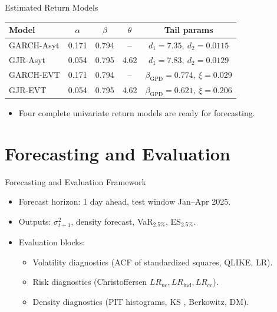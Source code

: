 \documentclass[aspectratio=169,11pt]{beamer}
\begin{document}
\begin{frame}{Estimated Return Models}
\small
\begin{table}
\centering
\begin{tabular}{lcccc}
\toprule
Model & \(\alpha\) & \(\beta\) & \(\theta\) & Tail params \\
\midrule
GARCH-Asyt & 0.171 & 0.794 & -- & \(d_1=7.35,\ d_2=0.0115\) \\
GJR-Asyt & 0.054 & 0.795 & 4.62 & \(d_1=7.83,\ d_2=0.0129\) \\
GARCH-EVT & 0.171 & 0.794 & -- & \(\beta_{\text{GPD}}=0.774,\ \xi=0.029\) \\
GJR-EVT & 0.054 & 0.795 & 4.62 & \(\beta_{\text{GPD}}=0.621,\ \xi=0.206\) \\
\bottomrule
\end{tabular}
\end{table}
\begin{itemize}
\item Four complete univariate return models are ready for forecasting.
\end{itemize}
\end{frame}

\section{Forecasting and Evaluation}
\begin{frame}{Forecasting and Evaluation Framework}
\begin{itemize} \setlength{\itemsep}{1em}
\item Forecast horizon: 1 day ahead, test window Jan--Apr 2025.
\item Outputs: \(\sigma^2_{t+1}\), density forecast, VaR\(_{2.5\%}\), ES\(_{2.5\%}\).
\item Evaluation blocks:
\begin{itemize}
\item Volatility diagnostics (ACF of standardized squares, QLIKE, LR).
\item Risk diagnostics (Christoffersen \(LR_{\text{uc}}, LR_{\text{ind}}, LR_{\text{cc}}\)).
\item Density diagnostics (PIT histograms, KS , Berkowitz, DM).
\end{itemize}
\end{itemize}
\end{frame}
\end{document}
